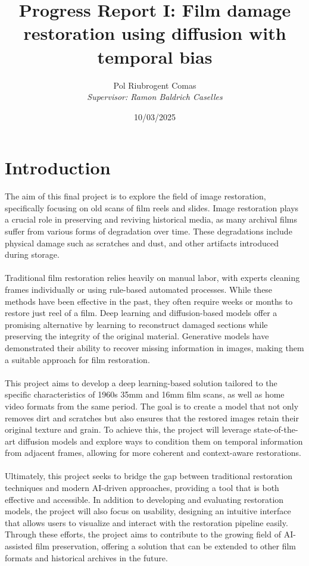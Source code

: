 \documentclass[openany, 12pt]{article}
\begin{document}
	\pagestyle{plain}
	\author{Pol Riubrogent Comas\\ \textit{Supervisor: Ramon Baldrich Caselles}}
	\title{\textbf{Progress Report I: Film damage restoration using diffusion with temporal bias}}
	\date{\small 10/03/2025}
	\maketitle
	\section{Introduction}
	{\color{blue}
The aim of this final project is to explore the field of image restoration, specifically focusing on old scans of film reels and slides. Image restoration plays a crucial role in preserving and reviving historical media, as many archival films suffer from various forms of degradation over time. These degradations include physical damage such as scratches and dust, and other artifacts introduced during storage. \\\\
Traditional film restoration relies heavily on manual labor, with experts cleaning frames individually or using rule-based automated processes. While these methods have been effective in the past, they often require weeks or months to restore just reel of a film. Deep learning and diffusion-based models offer a promising alternative by learning to reconstruct damaged sections while preserving the integrity of the original material. Generative models have demonstrated their ability to recover missing information in images, making them a suitable approach for film restoration.\\\\
This project aims to develop a deep learning-based solution tailored to the specific characteristics of 1960s 35mm and 16mm film scans, as well as home video formats from the same period. The goal is to create a model that not only removes dirt and scratches but also ensures that the restored images retain their original texture and grain. To achieve this, the project will leverage state-of-the-art diffusion models and explore ways to condition them on temporal information from adjacent frames, allowing for more coherent and context-aware restorations.\\\\
Ultimately, this project seeks to bridge the gap between traditional restoration techniques and modern AI-driven approaches, providing a tool that is both effective and accessible. In addition to developing and evaluating restoration models, the project will also focus on usability, designing an intuitive interface that allows users to visualize and interact with the restoration pipeline easily. Through these efforts, the project aims to contribute to the growing field of AI-assisted film preservation, offering a solution that can be extended to other film formats and historical archives in the future.}
\newpage
\end{document}
